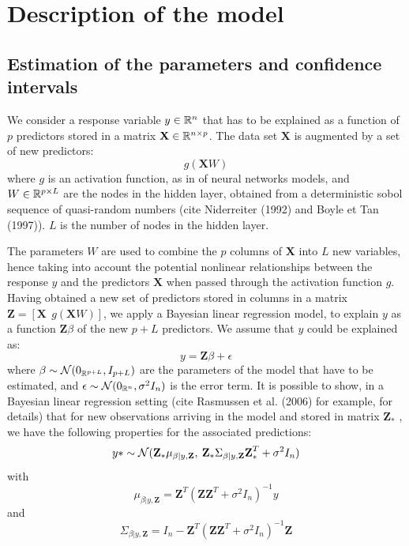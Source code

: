 \newpage

\section{Description of the model}
\label{sec:modelprez}

\subsection{Estimation of the parameters and confidence intervals}

We consider a response variable $y \in \mathbb{R}^n$ that has to be explained as a function of $p$ predictors stored in a matrix $\textbf{X} \in \mathbb{R}^{n \times p}$. The data set $\textbf{X}$ is augmented by a set of new predictors: 
$$
g \left(\textbf{X} W \right)
$$
where $g$ is an activation function, as in of neural networks models, and $W \in \mathbb{R}^{p \times L}$ are the nodes in the hidden layer, obtained from a deterministic sobol sequence of quasi-random numbers (cite Niderreiter (1992) and Boyle et Tan (1997)). $L$ is the number of nodes in the hidden layer. 

\medskip 

The parameters $W$ are used to combine the $p$ columns of \textbf{X} into $L$ new variables, hence taking into account the potential nonlinear relationships between the response $y$ and the predictors $\textbf{X}$ when passed through the activation function $g$. Having obtained a new set of predictors stored in columns in a matrix $\textbf{Z} = \left[ \textbf{X} \:\:  g \left(\textbf{X}W\right)\right]$, we apply a Bayesian linear regression model, to explain $y$ as a function $\textbf{Z} \beta$ of the new $p + L$ predictors. We assume that $y$ could be explained as: 
$$
y = \textbf{Z} \beta + \epsilon
$$
where $\beta \sim \mathcal{N}(0_{\mathbb{R}^{p + L}}, I_{p + L})$ are the parameters of the model that have to be estimated,  and $\epsilon \sim \mathcal{N}(0_{\mathbb{R}^n}, \sigma^2 I_n)$ is the error term. It is possible to show, in a Bayesian linear regression setting (cite Rasmussen et al. (2006) for example, for details) that for new observations arriving in the model and stored in matrix $\textbf{Z}_*$ , we have the following properties for the associated predictions: 
$$
y* \sim  \mathcal{N}(\textbf{Z}_* \mu_{\beta | y, \textbf{Z}}, \: \textbf{Z}_* \Sigma_{\beta | y, \textbf{Z}} \textbf{Z}_*^T + \sigma^2 I_n)
$$
with 
$$
\mu_{\beta | y, \textbf{Z}} = \textbf{Z}^T \left( \textbf{Z} \textbf{Z}^T + \sigma^2 I_n\right)^{-1}y
$$
and 
$$
\Sigma_{\beta | y, \textbf{Z}} = I_n - \textbf{Z}^T \left( \textbf{Z} \textbf{Z}^T + \sigma^2 I_n\right)^{-1}\textbf{Z}
$$

